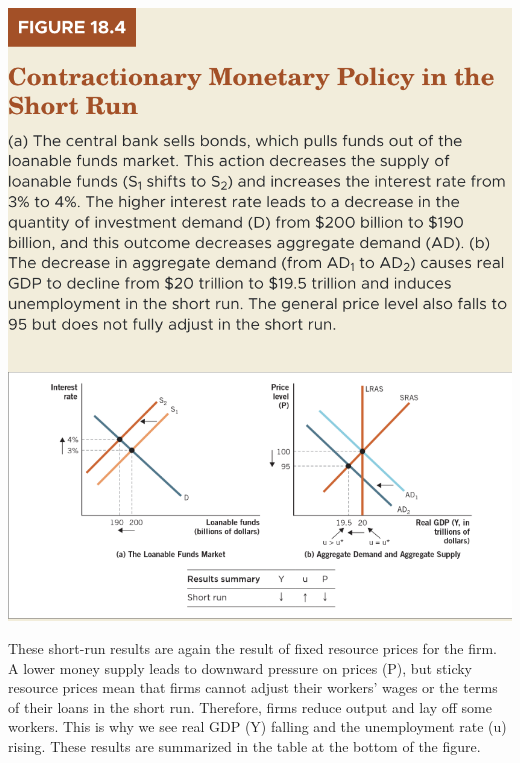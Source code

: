 \documentclass[11pt]{article} %
\begin{document}
\begin{center}
\includegraphics[scale=0.5]{images/Figure 18.4.png} 
\end{center}
These short-run results are again the result of fixed resource prices for the firm. A lower money supply leads to downward pressure on prices (P), but sticky resource prices mean that firms cannot adjust their workers' wages or the terms of their loans in the short run. Therefore, firms reduce output and lay off some workers. This is why we see real GDP (Y) falling and the unemployment rate (u) rising. These results are summarized in the table at the bottom of the figure.
\end{document}
